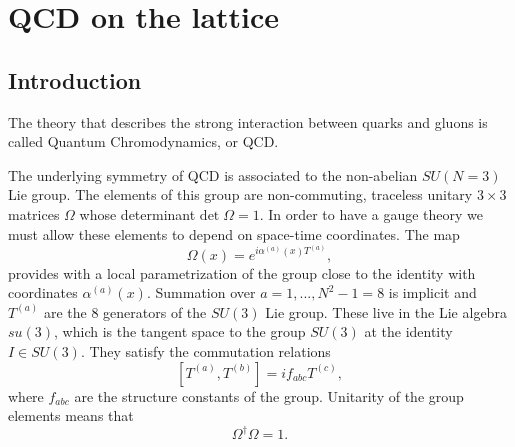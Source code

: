 \chapter{QCD on the lattice}%


\label{ch_foundation}


\section{Introduction}
\label{ch_foundation:sec:general}

The theory that describes the strong interaction between quarks and gluons is called Quantum Chromodynamics, or QCD. 

The underlying symmetry of QCD is associated to the non-abelian $SU(N=3)$ Lie group. The elements of this group are non-commuting, traceless unitary $3 \times 3$ matrices $\Omega$ whose determinant $\textrm{det}\;\Omega=1$. In order to have a gauge theory we must allow these elements to depend on space-time coordinates. The map
\begin{equation}
\Omega(x)=e^{i\alpha^{(a)}(x)T^{(a)}},
\end{equation}
provides with a local parametrization of the group close to the identity with coordinates $\alpha^{(a)}(x)$. Summation over $a=1,...,N^2-1=8$ is implicit and $T^{(a)}$ are the 8 generators of the $SU(3)$ Lie group. These live in the Lie algebra $su(3)$, which is the tangent space to the group $SU(3)$ at the identity $I\in SU(3)$. They satisfy the commutation relations
\begin{equation}
\left[T^{(a)}, T^{(b)}\right]=if_{abc}T^{(c)},
\end{equation}
where $f_{abc}$ are the structure constants of the group. Unitarity of the group elements means that
\begin{equation}
\Omega^{\dagger}\Omega=1.
\end{equation}

